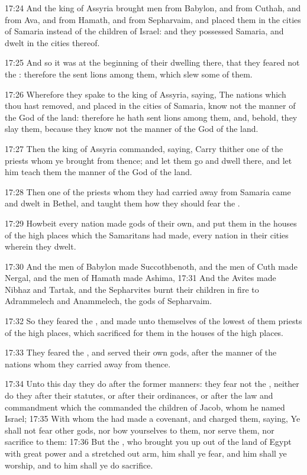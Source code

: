 17:24 And the king of Assyria brought men from Babylon, and from Cuthah, and from Ava, and from Hamath, and from Sepharvaim, and placed them in the cities of Samaria instead of the children of Israel: and they possessed Samaria, and dwelt in the cities thereof.

17:25 And so it was at the beginning of their dwelling there, that they feared not the \LORD: therefore the \LORD sent lions among them, which slew some of them.

17:26 Wherefore they spake to the king of Assyria, saying, The nations which thou hast removed, and placed in the cities of Samaria, know not the manner of the God of the land: therefore he hath sent lions among them, and, behold, they slay them, because they know not the manner of the God of the land.

17:27 Then the king of Assyria commanded, saying, Carry thither one of the priests whom ye brought from thence; and let them go and dwell there, and let him teach them the manner of the God of the land.

17:28 Then one of the priests whom they had carried away from Samaria came and dwelt in Bethel, and taught them how they should fear the \LORD.

17:29 Howbeit every nation made gods of their own, and put them in the houses of the high places which the Samaritans had made, every nation in their cities wherein they dwelt.

17:30 And the men of Babylon made Succothbenoth, and the men of Cuth made Nergal, and the men of Hamath made Ashima, 17:31 And the Avites made Nibhaz and Tartak, and the Sepharvites burnt their children in fire to Adrammelech and Anammelech, the gods of Sepharvaim.

17:32 So they feared the \LORD, and made unto themselves of the lowest of them priests of the high places, which sacrificed for them in the houses of the high places.

17:33 They feared the \LORD, and served their own gods, after the manner of the nations whom they carried away from thence.

17:34 Unto this day they do after the former manners: they fear not the \LORD, neither do they after their statutes, or after their ordinances, or after the law and commandment which the \LORD commanded the children of Jacob, whom he named Israel; 17:35 With whom the \LORD had made a covenant, and charged them, saying, Ye shall not fear other gods, nor bow yourselves to them, nor serve them, nor sacrifice to them: 17:36 But the \LORD, who brought you up out of the land of Egypt with great power and a stretched out arm, him shall ye fear, and him shall ye worship, and to him shall ye do sacrifice.

